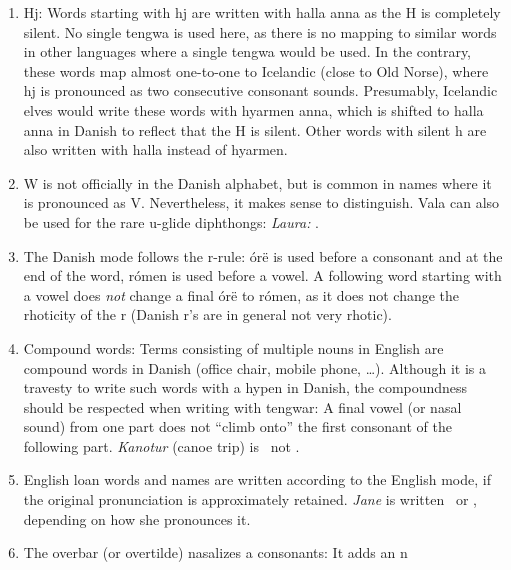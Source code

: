 \documentclass[a4paper]{article}
\begin{document}
\begin{enumerate}
  although the h is completely silent.  This is to acknowledge the
  common origin and almost one-to-one mapping with the wh- words in
  English (e.g. hvad \Thwestasindarinwa\Tanto\TTthreedots ~= what,
  hvor  = where, hvid = white).\label{noteHv}
\item Hj: Words starting with hj are written with halla anna as the H
  is completely silent.  No single tengwa is used here, as there is no
  mapping to similar words in other languages where a single tengwa
  would be used.  In the contrary, these words map almost one-to-one
  to Icelandic (close to Old Norse), where hj is pronounced as two
  consecutive consonant sounds.  Presumably, Icelandic elves would
  write these words with hyarmen anna, which is shifted to halla anna
  in Danish to reflect that the H is silent.  Other words with silent
  h are also written with halla instead of hyarmen.\label{notehalla}
\item W is not officially in the Danish alphabet, but is common in
  names where it is pronounced as V.  Nevertheless, it makes sense to
  distinguish.  Vala can also be used for the rare u-glide diphthongs:
  \emph{Laura:} \Tlambe\Tvala\TTthreedots\Troomen\Ttelco\TTthreedots.\label{noteW}
\item The Danish mode follows the r-rule: \'or\"e is used before a
  consonant and at the end of the word, r\'omen is used before a
  vowel.  A following word starting with a vowel does \emph{not}
  change a final \'or\"e to r\'omen, as it does not change the
  rhoticity of the r (Danish r's are in general not very rhotic).\label{noteR}
\item Compound words: Terms consisting of multiple nouns in English
  are compound words in Danish (office chair, mobile phone, \ldots).
  Although it is a travesty to write such words with a hypen in
  Danish, the compoundness should be respected when writing with
  tengwar: A final vowel (or nasal sound) from one part does not
  ``climb onto'' the first consonant of the following part.
  \emph{Kanotur} (canoe trip) is
  \Tquesse\Tnuumen\TTthreedots\Ttelco\TTrightcurl
  \Ttinco\Toore\TTleftcurl ~not
  \Tquesse\Tnuumen\TTthreedots\Ttinco\TTrightcurl\Toore\TTleftcurl.
\item English loan words and names are written according to the
  English mode, if the original pronunciation is approximately
  retained.  \emph{Jane} is written
  \Tanga\Tnuumen\TTthreedots\TTdotbelow ~or
  \Tanna\Tnuumen\TTthreedots\Ttelco\TTacute, depending on how she
  pronounces it.
\item The overbar (or overtilde) nasalizes a consonants: It adds an n

\end{enumerate}
\end{document}
